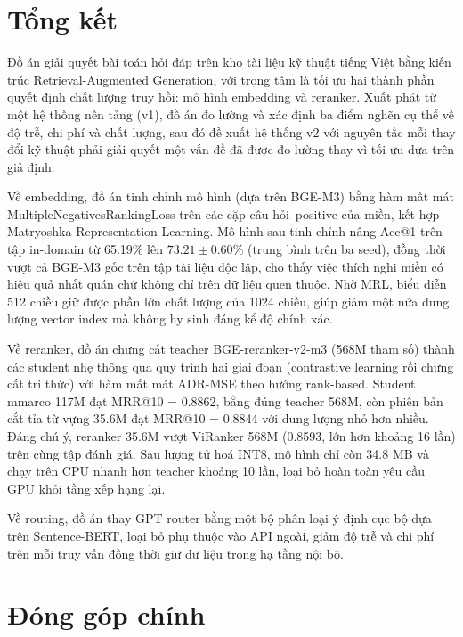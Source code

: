\documentclass[../DoAn.tex]{subfiles}
\begin{document}
\section{Tổng kết}
\label{section:5.1}

Đồ án giải quyết bài toán hỏi đáp trên kho tài liệu kỹ thuật tiếng Việt bằng kiến trúc Retrieval-Augmented Generation, với trọng tâm là tối ưu hai thành phần quyết định chất lượng truy hồi: mô hình embedding và reranker. Xuất phát từ một hệ thống nền tảng (v1), đồ án đo lường và xác định ba điểm nghẽn cụ thể về độ trễ, chi phí và chất lượng, sau đó đề xuất hệ thống v2 với nguyên tắc mỗi thay đổi kỹ thuật phải giải quyết một vấn đề đã được đo lường thay vì tối ưu dựa trên giả định.

Về embedding, đồ án tinh chỉnh mô hình  (dựa trên BGE-M3) bằng hàm mất mát MultipleNegativesRankingLoss trên các cặp câu hỏi--positive của miền, kết hợp Matryoshka Representation Learning. Mô hình sau tinh chỉnh nâng Acc@1 trên tập in-domain từ 65.19\% lên $73.21 \pm 0.60$\% (trung bình trên ba seed), đồng thời vượt cả BGE-M3 gốc trên tập tài liệu độc lập, cho thấy việc thích nghi miền có hiệu quả nhất quán chứ không chỉ trên dữ liệu quen thuộc. Nhờ MRL, biểu diễn 512 chiều giữ được phần lớn chất lượng của 1024 chiều, giúp giảm một nửa dung lượng vector index mà không hy sinh đáng kể độ chính xác.

Về reranker, đồ án chưng cất teacher BGE-reranker-v2-m3 (568M tham số) thành các student nhẹ thông qua quy trình hai giai đoạn (contrastive learning rồi chưng cất tri thức) với hàm mất mát ADR-MSE theo hướng rank-based. Student mmarco 117M đạt MRR@10 = 0.8862, bằng đúng teacher 568M, còn phiên bản cắt tỉa từ vựng 35.6M đạt MRR@10 = 0.8844 với dung lượng nhỏ hơn nhiều. Đáng chú ý, reranker 35.6M vượt ViRanker 568M (0.8593, lớn hơn khoảng 16 lần) trên cùng tập đánh giá. Sau lượng tử hoá INT8, mô hình chỉ còn 34.8 MB và chạy trên CPU nhanh hơn teacher khoảng 10 lần, loại bỏ hoàn toàn yêu cầu GPU khỏi tầng xếp hạng lại.

Về routing, đồ án thay GPT router bằng một bộ phân loại ý định cục bộ dựa trên Sentence-BERT, loại bỏ phụ thuộc vào API ngoài, giảm độ trễ và chi phí trên mỗi truy vấn đồng thời giữ dữ liệu trong hạ tầng nội bộ.

\section{Đóng góp chính}
\label{section:5.2}
\end{document}
